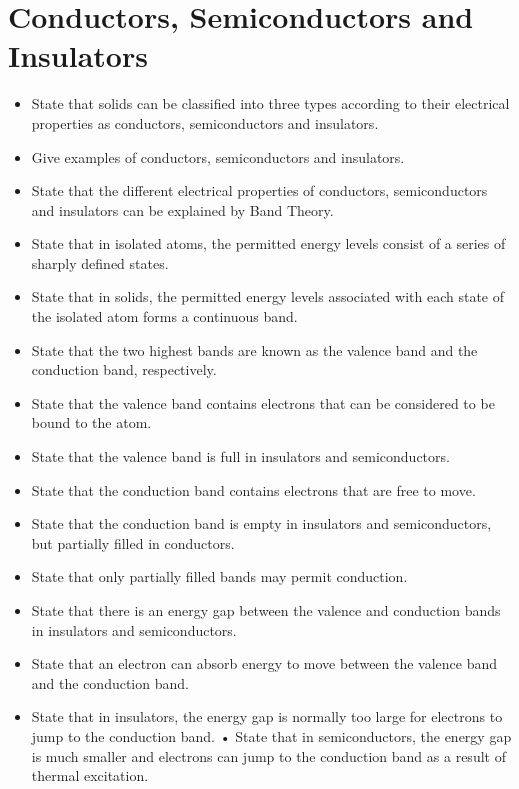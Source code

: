 \section{Conductors, Semiconductors and Insulators}
\begin{multicols}{2}
	\begin{itemize}
        \item State that solids can be classified into three types according to their
            electrical properties as conductors, semiconductors and insulators.
        \item Give examples of conductors, semiconductors and insulators.
        \item State that the different electrical properties of conductors,
            semiconductors and insulators can be explained by Band Theory.
        \item State that in isolated atoms, the permitted energy levels consist of a
            series of sharply defined states.
        \item State that in solids, the permitted energy levels associated with each
            state of the isolated atom forms a continuous band.
        \item State that the two highest bands are known as the valence band and
            the conduction band, respectively.
        \item State that the valence band contains electrons that can be considered
            to be bound to the atom.
        \item State that the valence band is full in insulators and semiconductors.
        \item State that the conduction band contains electrons that are free to
            move.
        \item State that the conduction band is empty in insulators and
            semiconductors, but partially filled in conductors.
        \item State that only partially filled bands may permit conduction.
        \item State that there is an energy gap between the valence and conduction
            bands in insulators and semiconductors.
        \item State that an electron can absorb energy to move between the valence
            band and the conduction band.
        \item State that in insulators, the energy gap is normally too large for
electrons to jump to the conduction band.
• State that in semiconductors, the energy gap is much smaller and
electrons can jump to the conduction band as a result of thermal
excitation.
        \end{itemize}
\end{multicols}

